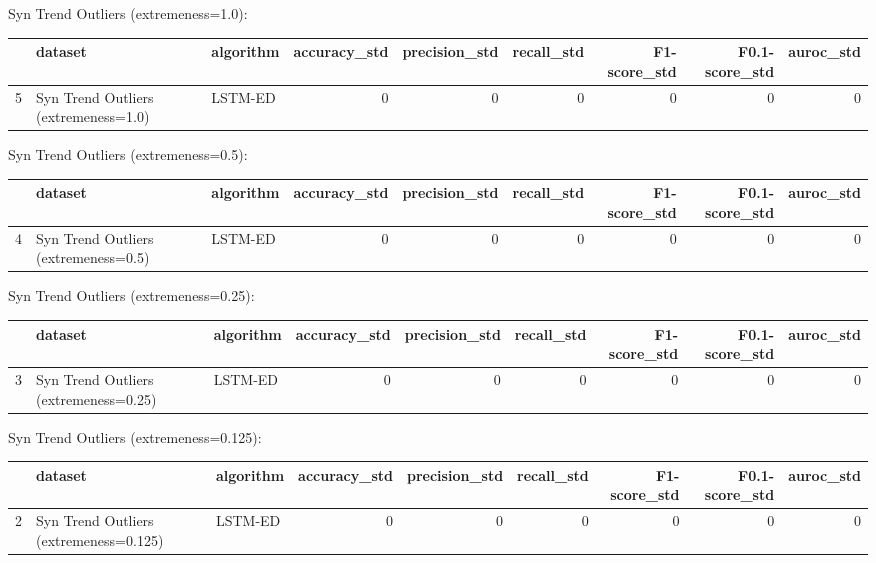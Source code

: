 Syn Trend Outliers (extremeness=1.0):

\begin{tabular}{rllrrrrrr}
\hline
    & dataset                              & algorithm   &   accuracy\_std &   precision\_std &   recall\_std &   F1-score\_std &   F0.1-score\_std &   auroc\_std \\
\hline
  5 & Syn Trend Outliers (extremeness=1.0) & LSTM-ED     &              0 &               0 &            0 &              0 &                0 &           0 \\
\hline
\end{tabular}

Syn Trend Outliers (extremeness=0.5):

\begin{tabular}{rllrrrrrr}
\hline
    & dataset                              & algorithm   &   accuracy\_std &   precision\_std &   recall\_std &   F1-score\_std &   F0.1-score\_std &   auroc\_std \\
\hline
  4 & Syn Trend Outliers (extremeness=0.5) & LSTM-ED     &              0 &               0 &            0 &              0 &                0 &           0 \\
\hline
\end{tabular}

Syn Trend Outliers (extremeness=0.25):

\begin{tabular}{rllrrrrrr}
\hline
    & dataset                               & algorithm   &   accuracy\_std &   precision\_std &   recall\_std &   F1-score\_std &   F0.1-score\_std &   auroc\_std \\
\hline
  3 & Syn Trend Outliers (extremeness=0.25) & LSTM-ED     &              0 &               0 &            0 &              0 &                0 &           0 \\
\hline
\end{tabular}

Syn Trend Outliers (extremeness=0.125):

\begin{tabular}{rllrrrrrr}
\hline
    & dataset                                & algorithm   &   accuracy\_std &   precision\_std &   recall\_std &   F1-score\_std &   F0.1-score\_std &   auroc\_std \\
\hline
  2 & Syn Trend Outliers (extremeness=0.125) & LSTM-ED     &              0 &               0 &            0 &              0 &                0 &           0 \\
\hline
\end{tabular}

